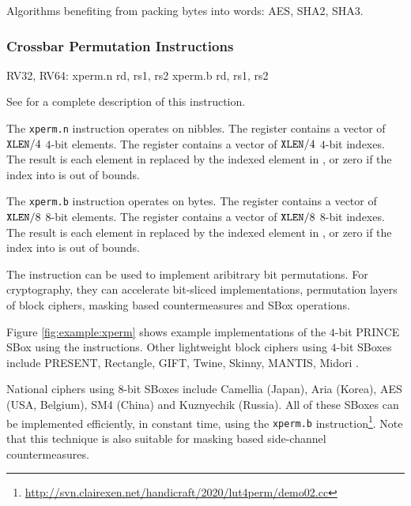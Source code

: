 Algorithms benefiting from packing bytes into words:
AES, SHA2, SHA3.


\subsubsection{Crossbar Permutation Instructions}
\label{sec:xperm}

\begin{cryptobitmanipisa}
RV32, RV64:
    xperm.n rd, rs1, rs2
    xperm.b rd, rs1, rs2
\end{cryptobitmanipisa}

See \cite[Section 2.2.4]{riscv:bitmanip:draft} for a complete
description of this instruction.

The {\tt xperm.n} instruction operates on nibbles.
The \rsone register contains a vector of ${\tt XLEN}/4$ $4$-bit elements.
The \rstwo register contains a vector of ${\tt XLEN}/4$ $4$-bit indexes.
The result is each element in \rstwo replaced by the indexed element
in \rsone, or zero if the index into \rstwo is out of bounds.

The {\tt xperm.b} instruction operates on bytes.
The \rsone register contains a vector of ${\tt XLEN}/8$ $8$-bit elements.
The \rstwo register contains a vector of ${\tt XLEN}/8$ $8$-bit indexes.
The result is each element in \rstwo replaced by the indexed element
in \rsone, or zero if the index into \rstwo is out of bounds.

The instruction can be used to implement aribitrary bit
permutations.
For cryptography, they can accelerate bit-sliced implementations,
permutation layers of block ciphers, masking based countermeasures
and SBox operations.

Figure \ref{fig:example:xperm} shows example implementations of the
$4$-bit PRINCE SBox using the instructions.
Other lightweight block ciphers using $4$-bit SBoxes include
PRESENT\cite{block:present},
Rectangle\cite{block:rectangle},
GIFT\cite{block:gift},
Twine\cite{block:twine},
Skinny, MANTIS\cite{block:skinny},
Midori \cite{block:midori}.

National ciphers using $8$-bit SBoxes include
Camellia\cite{block:camellia} (Japan), 
Aria\cite{block:aria} (Korea),
AES\cite{nist:fips:197} (USA, Belgium),
SM4\cite{block:sm4:1} (China)
and Kuznyechik (Russia).
All of these SBoxes can be implemented efficiently, in constant
time, using the {\tt xperm.b} instruction\footnote{
    \url{http://svn.clairexen.net/handicraft/2020/lut4perm/demo02.cc}
}.
Note that this technique is also suitable for masking based
side-channel countermeasures.

